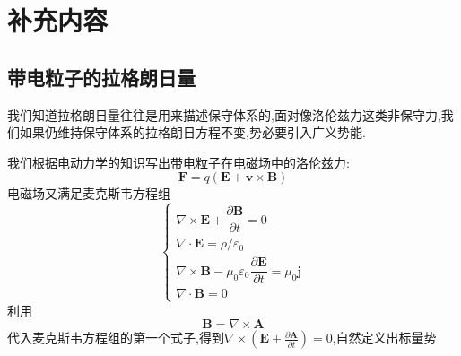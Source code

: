 

\chapter{补充内容}
\section{带电粒子的拉格朗日量}
我们知道拉格朗日量往往是用来描述保守体系的,面对像洛伦兹力这类非保守力,我们如果仍维持保守体系的拉格朗日方程不变,势必要引入广义势能.

我们根据电动力学的知识写出带电粒子在电磁场中的洛伦兹力:
\begin{equation}
    \boldsymbol F=q(\boldsymbol E+\boldsymbol v\times \boldsymbol  B)
\end{equation}
电磁场又满足麦克斯韦方程组
\begin{equation}
    \left\{\begin{array}{l}\nabla \times \boldsymbol{E}+\dfrac{\partial \boldsymbol{B}}{\partial t}=0 \\ \nabla \cdot \boldsymbol{E}=\rho / \varepsilon_{0} \\ \nabla \times \boldsymbol{B}-\mu_{0} \varepsilon_{0} \dfrac{\partial \boldsymbol{E}}{\partial t}=\mu_{0} \boldsymbol{j} \\ \nabla \cdot \boldsymbol{B}=0\end{array}\right.
\end{equation}
利用
\begin{equation}
    \boldsymbol{B}=\nabla \times \boldsymbol{A}
\end{equation}
代入麦克斯韦方程组的第一个式子,得到$\nabla \times\left(\boldsymbol{E}+\frac{\partial \boldsymbol{A}}{\partial t}\right)=0$,自然定义出标量势

